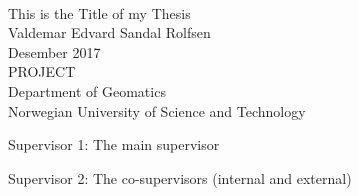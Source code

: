 
\thispagestyle{empty}
\mbox{}\\[6pc]
\begin{center}
\Huge{This is the Title of my Thesis}\\[2pc]

\Large{Valdemar Edvard Sandal Rolfsen}\\[1pc]
\large{Desember 2017}\\[2pc]

PROJECT\\
Department of Geomatics\\
Norwegian University of Science and Technology
\end{center}
\vfill

\noindent Supervisor 1: The main supervisor

\noindent Supervisor 2: The co-supervisors (internal and external)

